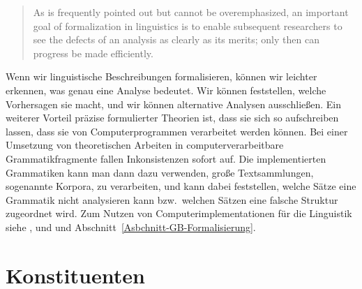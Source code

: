 \documentclass[ number=45
			   ,series=eotms
			   ,printondemand
			  ]{langsci}
\newcommand{\page}{S.\,}
\let\citew=\citealp
\begin{document}
\begin{quote}
As is frequently pointed out but cannot be overemphasized, an important goal
of formalization in linguistics is to enable subsequent researchers to see the defects
of an analysis as clearly as its merits; only then can progress be made efficiently.
\citep[\page322]{Dowty79a}
\end{quote}
%
Wenn wir linguistische Beschreibungen formalisieren, können wir leichter erkennen, was genau eine
Analyse bedeutet. Wir können feststellen, welche Vorhersagen sie macht, und wir können alternative
Analysen ausschließen. Ein weiterer Vorteil präzise formulierter Theorien ist, dass sie sich so
aufschreiben lassen, dass sie von Computerprogrammen verarbeitet werden können. Bei einer Umsetzung
von theoretischen Arbeiten in computerverarbeitbare Grammatikfragmente fallen Inkonsistenzen sofort
auf. Die implementierten Grammatiken kann man dann dazu verwenden, große Textsammlungen, sogenannte
Korpora, zu verarbeiten, und kann dabei feststellen, welche Sätze eine Grammatik nicht
analysieren kann bzw.\ welchen Sätzen eine falsche Struktur zugeordnet wird. Zum Nutzen von
Computerimplementationen für die Linguistik siehe \citew*[\page 163]{Bierwisch63},
\citew[Kapitel~22]{Mueller99a} und \citew{Bender2008c} und Abschnitt~\ref{Asbchnitt-GB-Formalisierung}.






\section{Konstituenten}
\label{konstituententests}
\end{document}
